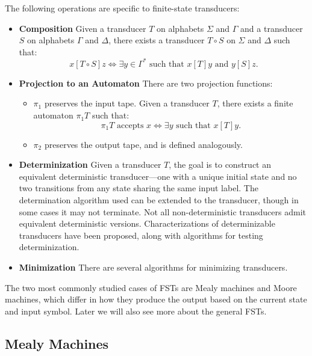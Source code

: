 The following operations are specific to finite-state transducers:

\begin{itemize}

    \item \textbf{Composition} Given a transducer $T$ on alphabets $\Sigma$ and $\Gamma$ and a transducer $S$ on alphabets $\Gamma$ and $\Delta$, 
    there exists a transducer $T \circ S$ on $\Sigma$ and $\Delta$ such that:
    \[
    x[T \circ S]z \iff \exists y \in \Gamma^* \text{ such that } x[T]y \text{ and } y[S]z.
    \]

    \item \textbf{Projection to an Automaton} There are two projection functions:
    \begin{itemize}
        \item $\pi_1$ preserves the input tape. Given a transducer $T$, there exists a finite automaton $\pi_1 T$ such that:
        \[
        \pi_1 T \text{ accepts } x \iff \exists y \text{ such that } x[T]y.
        \]

        \item $\pi_2$ preserves the output tape, and is defined analogously.
    \end{itemize}

    \item \textbf{Determinization} Given a transducer $T$, the goal is to construct an equivalent deterministic 
    transducer—one with a unique initial state and no two transitions from any state sharing the same input label. 
    The determination algorithm used can be extended to the transducer, though in some cases it may not terminate. 
    Not all non-deterministic transducers admit equivalent deterministic versions. 
    Characterizations of determinizable transducers have been proposed, along with algorithms for testing determinization. 

    \item \textbf{Minimization} There are several algorithms for minimizing transducers.

\end{itemize}
The two most commonly studied cases of FSTs are Mealy machines and Moore machines, which differ in how they produce the output based on the current state and input symbol.
Later we will also see more about the general FSTs.

\subsection{Mealy Machines}


